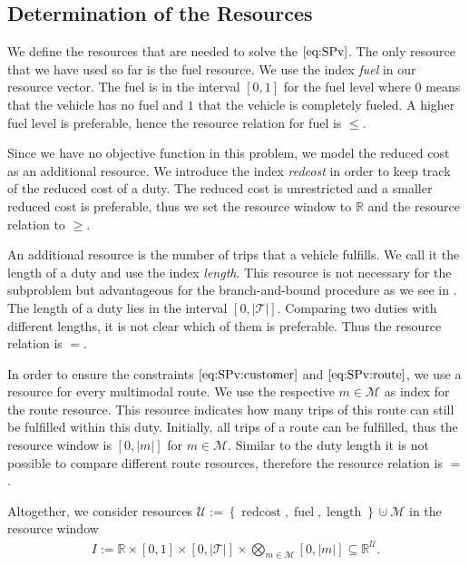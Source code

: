 \subsection{Determination of the Resources}
\label{sec:resources}

We define the resources that are needed to solve the $\eqref{eq:SPv}$. The only resource that we have used so far is the fuel resource. We use the index \emph{fuel} in our resource vector. The fuel is in the interval $[0,1]$ for the fuel level where $0$ means that the vehicle has no fuel and $1$ that the vehicle is completely fueled. A higher fuel level is preferable, hence the resource relation for fuel is $\leq$.

Since we have no objective function in this problem, we model the reduced cost as an additional resource. We introduce the index \emph{redcost} in order to keep track of the reduced cost of a duty. The reduced cost is unrestricted and a smaller reduced cost is preferable, thus we set the resource window to $\mathbb{R}$ and the resource relation to $\geq$.

An additional resource is the number of trips that a vehicle fulfills. We call it the length of a duty and use the index \emph{length}. This resource is not necessary for the subproblem but advantageous for the branch-and-bound procedure as we see in . The length of a duty lies in the interval $[0,|\mathcal{T}|]$. Comparing two duties with different lengths, it is not clear which of them is preferable. Thus the resource relation is $=$.

In order to ensure the constraints $\eqref{eq:SPv:customer}$ and $\eqref{eq:SPv:route}$, we use a resource for every multimodal route. We use the respective $m\in\mathcal{M}$ as index for the route resource. This resource indicates how many trips of this route can still be fulfilled within this duty. Initially, all trips of a route can be fulfilled, thus the resource window is $[0,|m|]$ for $m\in\mathcal{M}$. Similar to the duty length it is not possible to compare different route resources, therefore the resource relation is $=$.

Altogether, we consider resources ${\mathcal{U} := \left\{\operatorname{redcost},\operatorname{fuel},\operatorname{length}\right\}\cupdot\mathcal{M}}$ in the resource window
\begin{align*}
	I := \mathbb{R}\times[0,1]\times[0,|\mathcal{T}|]\times\bigotimes_{m\in\mathcal{M}}[0,|m|]\subseteq\mathbb{R}^{\mathcal{U}}.
\end{align*}

